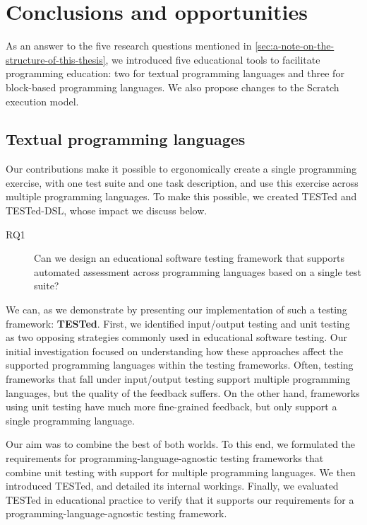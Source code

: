\documentclass[main]{subfiles}
\begin{document}
\chapter{Conclusions and opportunities}\label{ch:conclusions-and-opportunities}

As an answer to the five research questions mentioned in \cref{sec:a-note-on-the-structure-of-this-thesis},
we introduced five educational tools to facilitate programming education:
two for textual programming languages and three for block-based programming languages.
We also propose changes to the Scratch execution model.

\section{Textual programming languages}\label{sec:for-textual-programming-languages}

Our contributions make it possible to ergonomically create a single programming exercise, with one test suite and one task description, and use this exercise across multiple programming languages.
To make this possible, we created TESTed and TESTed-DSL, whose impact we discuss below.

\begin{description}
    \item[RQ1] Can we design an educational software testing framework that supports automated assessment across programming languages based on a single test suite?
\end{description}

We can, as we demonstrate by presenting our implementation of such a testing framework: \textbf{TESTed}.
First, we identified input/output testing and unit testing as two opposing strategies commonly used in educational software testing.
Our initial investigation focused on understanding how these approaches affect the supported programming languages within the testing frameworks.
Often, testing frameworks that fall under input/output testing support multiple programming languages, but the quality of the feedback suffers.
On the other hand, frameworks using unit testing have much more fine-grained feedback, but only support a single programming language.

Our aim was to combine the best of both worlds.
To this end, we formulated the requirements for programming-language-agnostic testing frameworks that combine unit testing with support for multiple programming languages.
We then introduced TESTed, and detailed its internal workings.
Finally, we evaluated TESTed in educational practice to verify that it supports our requirements for a programming-language-agnostic testing framework.
\end{document}
